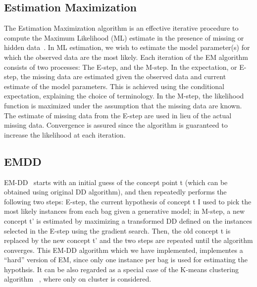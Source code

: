 \documentclass[conference,compsoc]{IEEEtran}
\begin{document}
\subsection{Estimation Maximization}
The Estimation Maximization algorithm is an effective iterative procedure to compute the Maximum Likelihood (ML) estimate in the presence of missing or hidden data~\cite{EMlink}. In ML estimation, we wish to estimate the model parameter(s) for which the observed data are the most likely.
Each iteration of the EM algorithm consists of two processes: The E-step, and the M-step. In the expectation, or E-step, the missing data are estimated given the observed data and current estimate of the model parameters. This is achieved using the conditional expectation, explaining the choice of terminology. In the M-step, the likelihood function is maximized under the assumption that the missing data are known. The estimate of missing data from the E-step are used in lieu of the actual missing data.
Convergence is assured since the algorithm is guaranteed to increase the likelihood at each iteration.
\subsection{EMDD}
EM-DD~\cite{MILlink} starts with an initial guess of the concept point t (which can be obtained using original DD algorithm), and then repeatedly performs the following two steps: E-step, the current hypothesis of concept t I used to pick the most likely instances from each bag given a generative model; in M-step, a new concept t’ is estimated by maximizing a transformed DD defined on the instances selected in the E-step using the gradient search. Then, the old concept t is replaced by the new concept t’ and the two steps are repeated until the algorithm converges. This EM-DD algorithm which we have implemented, implementes a “hard” version of EM, since only one instance per bag is used for estimating the hypothsis. It can be also regarded as a special case of the K-means clustering algorithm~\cite{Harti} , where only on cluster is considered.
\end{document}
